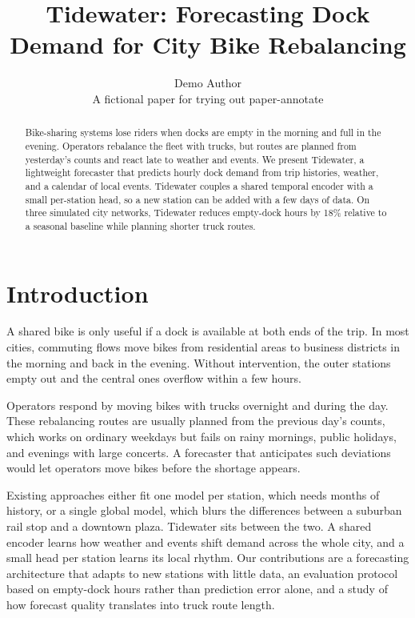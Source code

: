 \documentclass[10pt,twocolumn,letterpaper]{article}
\title{\textbf{Tidewater: Forecasting Dock Demand for City Bike Rebalancing}}
\author{Demo Author\\{\small A fictional paper for trying out paper-annotate}}
\date{}
\begin{document}
\maketitle

\begin{abstract}
Bike-sharing systems lose riders when docks are empty in the morning and full in the evening.
Operators rebalance the fleet with trucks, but routes are planned from yesterday's counts and react late to weather and events.
We present Tidewater, a lightweight forecaster that predicts hourly dock demand from trip histories, weather, and a calendar of local events.
Tidewater couples a shared temporal encoder with a small per-station head, so a new station can be added with a few days of data.
On three simulated city networks, Tidewater reduces empty-dock hours by 18\% relative to a seasonal baseline while planning shorter truck routes.
\end{abstract}

\section{Introduction}

A shared bike is only useful if a dock is available at both ends of the trip.
In most cities, commuting flows move bikes from residential areas to business districts in the morning and back in the evening.
Without intervention, the outer stations empty out and the central ones overflow within a few hours.

Operators respond by moving bikes with trucks overnight and during the day.
These rebalancing routes are usually planned from the previous day's counts, which works on ordinary weekdays but fails on rainy mornings, public holidays, and evenings with large concerts.
A forecaster that anticipates such deviations would let operators move bikes before the shortage appears.

Existing approaches either fit one model per station, which needs months of history, or a single global model, which blurs the differences between a suburban rail stop and a downtown plaza.
Tidewater sits between the two.
A shared encoder learns how weather and events shift demand across the whole city, and a small head per station learns its local rhythm.
Our contributions are a forecasting architecture that adapts to new stations with little data, an evaluation protocol based on empty-dock hours rather than prediction error alone, and a study of how forecast quality translates into truck route length.
\end{document}
